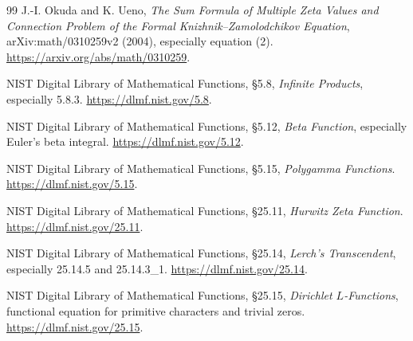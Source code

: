 \documentclass[11pt,a4paper]{article}
\numberwithin{equation}{section}
\theoremstyle{definition}
\theoremstyle{remark}
\begin{document}
\begin{thebibliography}{99}
J.-I. Okuda and K. Ueno,
\emph{The Sum Formula of Multiple Zeta Values and Connection Problem
of the Formal Knizhnik--Zamolodchikov Equation},
arXiv:math/0310259v2 (2004), especially equation (2).
\url{https://arxiv.org/abs/math/0310259}.

NIST Digital Library of Mathematical Functions,
\S5.8, \emph{Infinite Products}, especially 5.8.3.
\url{https://dlmf.nist.gov/5.8}.

NIST Digital Library of Mathematical Functions,
\S5.12, \emph{Beta Function}, especially Euler's beta integral.
\url{https://dlmf.nist.gov/5.12}.

NIST Digital Library of Mathematical Functions,
\S5.15, \emph{Polygamma Functions}.
\url{https://dlmf.nist.gov/5.15}.

NIST Digital Library of Mathematical Functions,
\S25.11, \emph{Hurwitz Zeta Function}.
\url{https://dlmf.nist.gov/25.11}.

NIST Digital Library of Mathematical Functions,
\S25.14, \emph{Lerch's Transcendent},
especially 25.14.5 and 25.14.3\_1.
\url{https://dlmf.nist.gov/25.14}.

NIST Digital Library of Mathematical Functions,
\S25.15, \emph{Dirichlet $L$-Functions}, functional equation
for primitive characters and trivial zeros.
\url{https://dlmf.nist.gov/25.15}.

\end{thebibliography}

\end{document}
